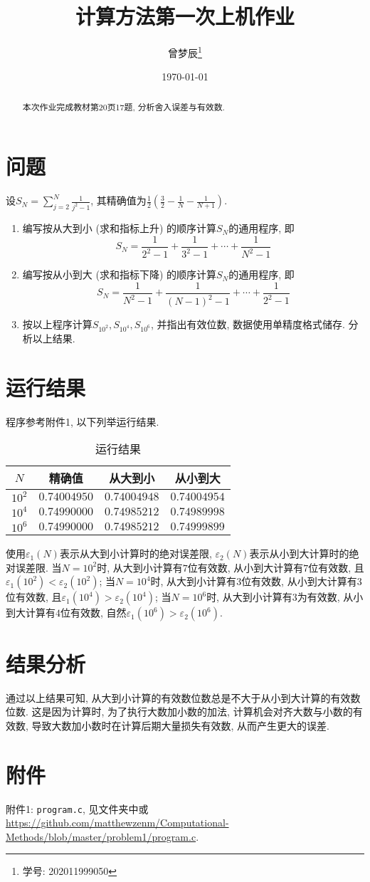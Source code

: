 \documentclass{ctexart}
\title{计算方法第一次上机作业}
\author{曾梦辰\thanks{学号: 202011999050}}
\date{\today}
\begin{document}
\maketitle
\begin{abstract}
    本次作业完成教材第20页17题, 分析舍入误差与有效数.
\end{abstract}

\section{问题}
设$\displaystyle S_N=\sum_{j=2}^N\frac{1}{j^2-1}$, 其精确值为$\displaystyle\frac{1}{2}\left(\frac{3}{2}-\frac{1}{N}-\frac{1}{N+1}\right)$.
\begin{enumerate}[(1)]
    \item 编写按从大到小 (求和指标上升) 的顺序计算$S_N$的通用程序, 即
    \[S_N=\frac{1}{2^2-1}+\frac{1}{3^2-1}+\cdots+\frac{1}{N^2-1}\]
    \item 编写按从小到大 (求和指标下降) 的顺序计算$S_N$的通用程序, 即
    \[S_N=\frac{1}{N^2-1}+\frac{1}{(N-1)^2-1}+\cdots+\frac{1}{2^2-1}\]
    \item 按以上程序计算$S_{10^2},S_{10^4},S_{10^6}$, 并指出有效位数, 数据使用单精度格式储存.
    分析以上结果.
\end{enumerate}

\section{运行结果}
程序参考附件1, 以下列举运行结果.
\begin{table}[H]
    \centering
    \begin{tabular}{|c|c|c|c|}
    \hline
    $N$    & 精确值        & 从大到小         & 从小到大         \\ \hline
    $10^2$ & $0.74004950$ & $0.74004948$   & $0.74004954$   \\ \hline
    $10^4$ & $0.74990000$ & $0.74985212$   & $0.74989998$   \\ \hline
    $10^6$ & $0.74990000$ & $0.74985212$   & $0.74999899$   \\ \hline
    \end{tabular}
    \caption{运行结果}
\end{table}

使用$\varepsilon_1(N)$表示从大到小计算时的绝对误差限, $\varepsilon_2(N)$表示从小到大计算时的绝对误差限.
当$N=10^2$时, 从大到小计算有$7$位有效数, 从小到大计算有$7$位有效数, 且$\varepsilon_1(10^2)<\varepsilon_2(10^2)$;
当$N=10^4$时, 从大到小计算有$3$位有效数, 从小到大计算有$3$位有效数, 且$\varepsilon_1(10^4)>\varepsilon_2(10^4)$;
当$N=10^6$时, 从大到小计算有$3$为有效数, 从小到大计算有$4$位有效数, 自然$\varepsilon_1(10^6)>\varepsilon_2(10^6)$.

\section{结果分析}
通过以上结果可知, 从大到小计算的有效数位数总是不大于从小到大计算的有效数位数.
这是因为计算时, 为了执行大数加小数的加法, 计算机会对齐大数与小数的有效数, 导致大数加小数时在计算后期大量损失有效数, 从而产生更大的误差.

\section{附件}
附件1: \verb|program.c|, 见文件夹中或\url{https://github.com/matthewzenm/Computational-Methods/blob/master/problem1/program.c}.
\end{document}

